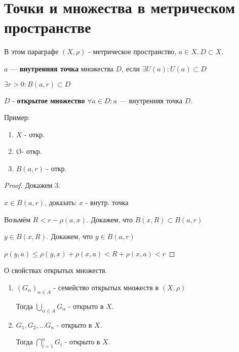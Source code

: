 \section{Точки и множества в метрическом пространстве}

В этом параграфе $(X,\rho)$ - метрическое пространство, $a\in X, D\subset X$.

\begin{definition}
    $a$ --- \textbf{внутренняя точка} множества $D$, если $\exists U(a) : U(a)\subset D$

    $\exists r>0 : B(a,r)\subset D$
\end{definition}

\begin{definition}
    $D$ - \textbf{открытое множество} $\forall a\in D : a$ --- внутренняя точка $D$. 
\end{definition}

Пример:
\begin{enumerate}
    \itemsep0em
    \item $X$ - откр.
    \item \O - откр.
    \item $B(a,r)$ - откр.
\end{enumerate}

\begin{proof}
    Докажем 3.

    $x\in B(a,r)$, доказать: $x$ - внутр. точка

    Возьмём $R<r-\rho(a,x)$. Докажем, что $B(x,R)\subset B(a,r)$

    $y\in B(x,R)$. Докажем, что $y\in B(a,r)$

    $\rho(y,a)\leq\rho(y,x)+\rho(x,a)<R+\rho(x,a)<r$
\end{proof}

\begin{theorem}
    О свойствах открытых множеств.

    \begin{enumerate}
        \item $(G_\alpha)_{\alpha\in A}$ - семейство открытых множеств в $(X,\rho)$
        
        Тогда $\bigcup\limits_{\alpha\in A} G_\alpha$ - открыто в $X$.

        \item $G_1,G_2,\ldots G_n$ - открыто в $X$.
        
        Тогда $\bigcap\limits_{i=1}^{n} G_i$ - открыто в $X$.
    \end{enumerate}

\end{theorem}

